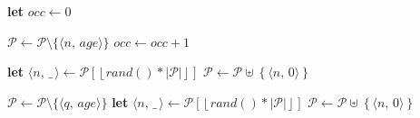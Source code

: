 
\small
{}
\DontPrintSemicolon
\LinesNumbered
  
 { %
  \textbf{let} $occ \leftarrow 0$ \;

   {
     {
       $\mathcal{P} \leftarrow \mathcal{P}\setminus \{\langle n,\,age\rangle \}$ \;
       $occ \leftarrow occ + 1$ \;
    }
  }

   {
     {
       \textbf{let} $\langle n,\,\_ \,\rangle \leftarrow
         \mathcal{P}[\left\lfloor rand()*|\mathcal{P}|\right\rfloor]$ \;
       $\mathcal{P} \leftarrow \mathcal{P} \uplus \left\{\langle n,\, 0\rangle\right\}$
    }
  }
}

\BlankLine

 {
  $\mathcal{P} \leftarrow \mathcal{P}\setminus \{\langle q,\,age\rangle \}$ \;
  \textbf{let} $\langle n,\,\_ \,\rangle \leftarrow
  \mathcal{P}[\left\lfloor rand()*|\mathcal{P}|\right\rfloor]$ \;
  $\mathcal{P} \leftarrow \mathcal{P} \uplus \left\{\langle n,\, 0\rangle\right\}$ \;
}
